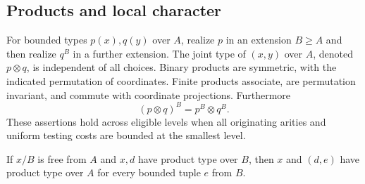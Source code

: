 \subsection{Products and local character}

\begin{proposition}
\label{calc:products}
For bounded types $p(x),q(y)$ over $A$, realize $p$ in an extension
$B\ge A$ and then realize $q^B$ in a further extension.  The joint
type of $(x,y)$ over $A$, denoted $p\otimes q$, is independent of all
choices.  Binary products are symmetric, with the indicated
permutation of coordinates.  Finite products associate, are
permutation invariant, and commute with coordinate projections.
Furthermore
\begin{equation}
\label{calc:free-product-formula}
 (p\otimes q)^B=p^B\otimes q^B.
\end{equation}
These assertions hold across eligible levels when all originating
arities and uniform testing costs are bounded at the smallest level.

If $x/B$ is free from $A$ and $x,d$ have product type over $B$, then
$x$ and $(d,e)$ have product type over $A$ for every bounded tuple
$e$ from $B$.
\end{proposition}

